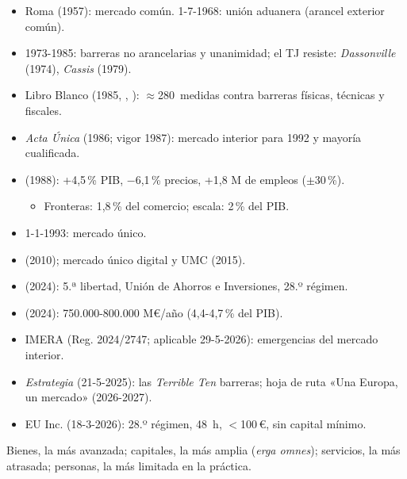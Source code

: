 \documentclass{article}
\begin{document}
\begin{columnas}
\begin{itemize}
\item Roma (1957): mercado común. 1-7-1968: unión aduanera (arancel exterior común).
\item 1973-1985: barreras no arancelarias y unanimidad; el TJ resiste: \emph{Dassonville} (1974), \emph{Cassis} (1979).
\end{itemize}
\begin{itemize}
\item Libro Blanco (1985, , ): $\approx$280~medidas contra barreras físicas, técnicas y fiscales.
\item \emph{Acta Única} (1986; vigor 1987): mercado interior para 1992 y mayoría cualificada.
\item {} (1988): +4,5\,\% PIB, $-$6,1\,\% precios, +1,8 M de empleos ($\pm$30\,\%).
  \begin{itemize}
  \item Fronteras: 1,8\,\% del comercio; escala: 2\,\% del PIB.
  \end{itemize}
\item 1-1-1993: mercado único.
\end{itemize}
\begin{itemize}
\item {} (2010); mercado único digital y UMC (2015).
\item {} (2024): 5.ª libertad, Unión de Ahorros e Inversiones, 28.º régimen.
\item {} (2024): 750.000-800.000 M€/año (4,4-4,7\,\% del PIB).
\item IMERA (Reg. 2024/2747; aplicable 29-5-2026): emergencias del mercado interior.
\item \emph{Estrategia} (21-5-2025): las \emph{Terrible Ten} barreras; hoja de ruta «Una Europa, un mercado» (2026-2027).
\item EU Inc. (18-3-2026): 28.º régimen, 48~h, $<$100\,€, sin capital mínimo.
\end{itemize}

\begin{ideaclave}
Bienes, la más avanzada; capitales, la más amplia (\emph{erga omnes}); servicios, la más atrasada; personas, la más limitada en la práctica.
\end{ideaclave}


\end{columnas}
\end{document}
